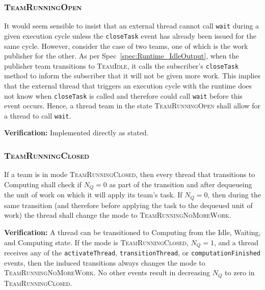 \documentclass{article}
\newcommand{\TeamIdle}          {\textsc{TeamIdle}}
\newcommand{\TeamRunningOpen}   {\textsc{TeamRunningOpen}}
\newcommand{\TeamRunningClosed} {\textsc{TeamRunningClosed}}
\newcommand{\TeamRunningNoMoreWork} {\textsc{TeamRunningNoMoreWork}}
\begin{document}
\subsubsection{\TeamRunningOpen}
\begin{spec}
It  would seem sensible to insist that an external thread cannot call
\texttt{wait} during a given execution cycle unless the \texttt{closeTask} event
has already been issued for the same cycle.  However, consider the case of two
teams, one of which is the work publisher for the other.  As per
Spec~\ref{spec:Runtime_IdleOutput}, when the publisher team transitions to
{\TeamIdle}, it calls the subscriber's \texttt{closeTask} method to inform the
subscriber that it will not be given more work.  This implies that the external
thread that triggers an execution cycle with the runtime does not know when
\texttt{closeTask} is called and therefore could call \texttt{wait} before this
event occurs.  Hence, a thread team in the state {\TeamRunningOpen} shall allow
for a thread to call \texttt{wait}.
\end{spec}
\textbf{Verification:}\hspace{0.125in}  Implemented directly as stated.

\subsubsection{\TeamRunningClosed}
\begin{spec}
\label{spec:Closed_Transition}
If a team is in mode \TeamRunningClosed, then every thread that transitions to
Computing shall check if $N_Q = 0$ as part of the transition and after
dequeueing the unit of work on which it will apply its team's task.  If $N_Q =
0$, then during the same transition (and therefore before applying the task to
the dequeued unit of work) the thread shall change the mode to
\TeamRunningNoMoreWork.
\end{spec}
\textbf{Verification:}\hspace{0.125in}  A thread can be transitioned to
Computing from the Idle, Waiting, and Computing state.  If the mode is
{\TeamRunningClosed}, $N_Q = 1$, and a
thread receives any of the \texttt{activateThread}, \texttt{transitionThread},
or \texttt{computationFinished} events, then the induced transitions always changes
the mode to \TeamRunningNoMoreWork.  No other events result in decreasing $N_Q$
to zero in \TeamRunningClosed.
\end{document}

